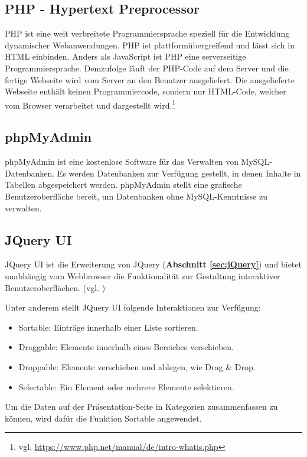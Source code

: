 \subsection{PHP - Hypertext Preprocessor}
\label{subsec:php}
PHP ist eine weit verbreitete Programmiersprache speziell für die Entwicklung dynamischer Webanwendungen. PHP ist plattformübergreifend und lässt sich in HTML einbinden. Anders als JavaScript ist PHP eine serverseitige Programmiersprache. Demzufolge läuft der PHP-Code auf dem Server und die fertige Webseite wird vom Server an den Benutzer ausgeliefert. Die ausgelieferte Webseite enthält keinen Programmiercode, sondern nur HTML-Code, welcher vom Browser verarbeitet und dargestellt wird.\footnote{vgl. \url{https://www.php.net/manual/de/intro-whatis.php}}

\subsection{phpMyAdmin}
\label{subsec:phpMyAdmin}
phpMyAdmin ist eine kostenlose Software für das Verwalten von MySQL-Datenbanken. Es werden Datenbanken zur Verfügung gestellt, in denen Inhalte in Tabellen abgespeichert werden. phpMyAdmin stellt eine grafische Benutzeroberfläche bereit, um Datenbanken ohne MySQL-Kenntnisse zu verwalten.

\subsection{JQuery UI}
\label{subsec:JQuery UI}
JQuery UI ist die Erweiterung von JQuery (\textbf{Abschnitt \ref{sec:jQuery}}) und bietet unabhängig vom Webbrowser die Funktionalität zur Gestaltung interaktiver Benutzeroberflächen. (vgl. \cite{Ste2019})\bigskip

Unter anderem stellt JQuery UI folgende Interaktionen zur Verfügung:
\begin{itemize}
\item Sortable: Einträge innerhalb einer Liste sortieren.
\item Draggable: Elemente innerhalb eines Bereiches verschieben.
\item Droppable: Elemente verschieben und ablegen, wie Drag \& Drop.
\item Selectable: Ein Element oder mehrere Elemente selektieren.
\end{itemize}

Um die Daten auf der Präsentation-Seite in Kategorien zusammenfassen zu können, wird dafür die Funktion \glqq Sortable\grqq{} angewendet.

